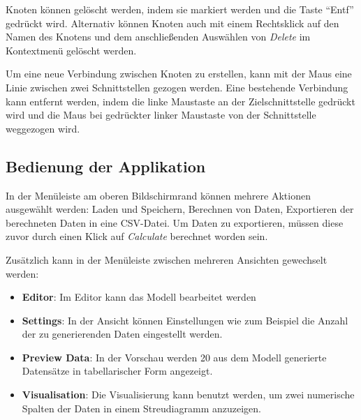 Knoten können gelöscht werden, indem sie markiert werden und die Taste \enquote{Entf} gedrückt wird. Alternativ können Knoten auch mit einem Rechtsklick auf den Namen des Knotens und dem anschließenden Auswählen von \textit{Delete} im Kontextmenü gelöscht werden.

Um eine neue Verbindung zwischen Knoten zu erstellen, kann mit der Maus eine Linie zwischen zwei Schnittstellen gezogen werden. Eine bestehende Verbindung kann entfernt werden, indem die linke Maustaste an der Zielschnittstelle gedrückt wird und die Maus bei gedrückter linker Maustaste von der Schnittstelle weggezogen wird.

\subsection*{Bedienung der Applikation}

In der Menüleiste am oberen Bildschirmrand können mehrere Aktionen ausgewählt werden: Laden und Speichern, Berechnen von Daten, Exportieren der berechneten Daten in eine CSV-Datei. Um Daten zu exportieren, müssen diese zuvor durch einen Klick auf \textit{Calculate} berechnet worden sein.

Zusätzlich kann in der Menüleiste zwischen mehreren Ansichten gewechselt werden:
\begin{itemize}
    \item \textbf{Editor}: Im Editor kann das Modell bearbeitet werden
    \item \textbf{Settings}: In der Ansicht können Einstellungen wie zum Beispiel die Anzahl der zu generierenden Daten eingestellt werden.
    \item \textbf{Preview Data}: In der Vorschau werden 20 aus dem Modell generierte Datensätze in tabellarischer Form angezeigt.
    \item \textbf{Visualisation}: Die Visualisierung kann benutzt werden, um zwei numerische Spalten der Daten in einem Streudiagramm anzuzeigen.
\end{itemize}